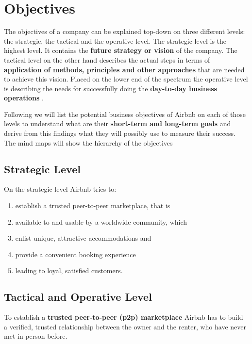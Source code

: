 \section{Objectives} %
\label{sec:objectives}
The objectives of a company can be explained top-down on three different levels: the strategic, the tactical and the operative level. The strategic level is the highest level. It contains the {\bf future strategy or vision} of the company. The tactical level on the other hand describes the actual steps in terms of {\bf application of methods, principles and other approaches} that are needed to achieve this vision. Placed on the lower end of the spectrum the operative level is describing the needs for successfully doing the {\bf day-to-day business operations} \citep{Boundless14}.
\vspace{0.2cm}

Following we will list the potential business objectives of Airbnb on each of those levels to understand what are their {\bf short-term and long-term goals} and derive from this findings what they will possibly use to measure their success. The mind maps will show the hierarchy of the objectives 

\subsection{Strategic Level} %
\label{sub:strategic_lvl}
On the strategic level Airbnb tries to:
	\begin{enumerate}
    	\item establish a trusted peer-to-peer marketplace, that is
        \item available to and usable by a worldwide community, which
        \item enlist unique, attractive accommodations and
        \item provide a convenient booking experience 
        \item leading to loyal, satisfied customers. 
    \end{enumerate}


\subsection{Tactical and Operative Level} %
\label{sub:tactical_operative_lvl}
To establish a {\bf trusted peer-to-peer (p2p) marketplace} Airbnb has to build a verified, trusted relationship between the owner and the renter, who have never met in person before. 
\vspace{0.2cm}

